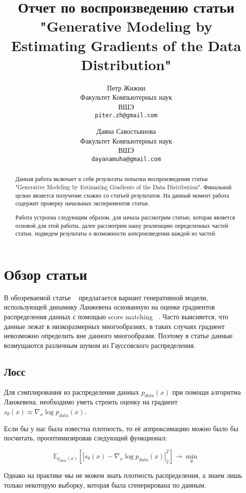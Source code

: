 \documentclass{article}
\title{Отчет по воспроизведению статьи "Generative Modeling by Estimating Gradients of the Data Distribution"}
\author{%
  Петр Жижин \\
  Факультет Компьютерных наук\\
  ВШЭ\\
  \texttt{piter.zh@gmail.com} \\
   \and
   Даяна Савостьянова \\
   Факультет Компьютерных наук\\
   ВШЭ\\
   \texttt{dayanamuha@gmail.com} \\
}
\begin{document}

\maketitle

\begin{abstract}
  Данная работа включает в себя результаты попытки воспроизведения статьи 
  "Generative Modeling by Estimating Gradients of the Data Distribution". Финальной целью является получение схожих со статьей результатов. На данный момент работа содержит проверку начальных экспериментов статьи.
  
  Работа устроена следующим образом, для начала рассмотрим статью, которая является основой для этой работы, далее рассмотрим нашу реализацию определенных частей статьи, подведем результаты о возможности аопсроизведения каждой из частей.
\end{abstract}


\section{Обзор статьи}

В обозреваемой статье ~\cite{DBLP:journals/corr/abs-1907-05600} предлагается вариант генеративной модели, использующей динамику Ланжевена основанную на оценке градиентов распределения данных с помощью score matching ~\cite{DBLP:journals/corr/abs-1907-05600}. Часто выясняется, что данные лежат в низкоразмерных многообразиях, в таких случаях градиент невозможно определить вне данного многообразия. Поэтому в статье данные возмущаются различным шумом из Гауссовского распределения.

\subsection{Лосс}

Для сэмплирования из распределения данных $p_{data}(x)$ при помощи алгоритма
Ланжевена, необходимо уметь строить оценку на градиент
$s_{\theta}(x) \approx \nabla_x \log p_{data}(x)$.

Если бы у нас была известна плотность, то её аппроксимацию можно было бы
посчитать, прооптимизировав следующий функционал:

\[
\mathbb{E}_{p_{data}(x)} \left[ | s_{\theta}(x) - \nabla_x \log p_{data}(x) |_2^2 \right] \to \min_{\theta}
\]

Однако на практике мы не можем знать плотность распределения, а знаем лишь
только некоторую выборку, которая была сгенерирована по данным.
\end{document}
